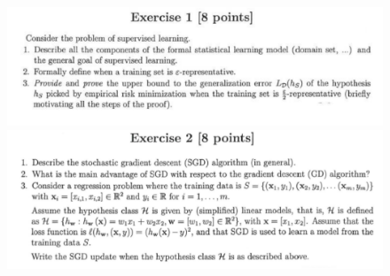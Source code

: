 \documentclass[a4paper,11pt,oneside]{book}
\begin{document}
\begin{figure}[H]
    \centering
    \begin{minipage}{0.45\textwidth}
        \includegraphics[width=\textwidth,page=3]{images/ex1_31_Jan_2023.png}
    \end{minipage}
    \hfill
    \begin{minipage}{0.45\textwidth}
        \includegraphics[width=\textwidth,page=5]{images/ex2_31_Jan_2023.png}
    \end{minipage}
    
    \vspace{1cm}
    

\end{figure}
\end{document}
